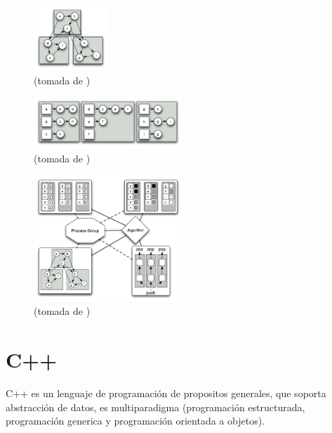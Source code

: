 	\begin{figure}[H]
		\centering
		\includegraphics[width=0.25\textwidth]{aux/distributed-graph}
		\caption[Grafo Distribuido]{
		(tomada de \cite{BoostGrafos})}
	\end{figure}
	

	\begin{figure}[H]
		\centering
		\includegraphics[width=0.5\textwidth]{aux/dist-adjlist}
		\caption[Grafo en lista de adyacencia]{
		(tomada de \cite{BoostGrafos})}
	\end{figure}


	\begin{figure}[H]
		\centering
		\includegraphics[width=0.5\textwidth]{aux/arquitectura_grafos}
		\caption[Aquitectura de Grafos]{
		(tomada de \cite{BoostGrafos})}
	\end{figure}
	

	\section{C++}

	C++ es un lenguaje de programación de propositos generales,  que soporta abstracción de datos, es multiparadigma (programación estructurada, programación generica\cite{andrei2001modern} y programación orientada a objetos).

